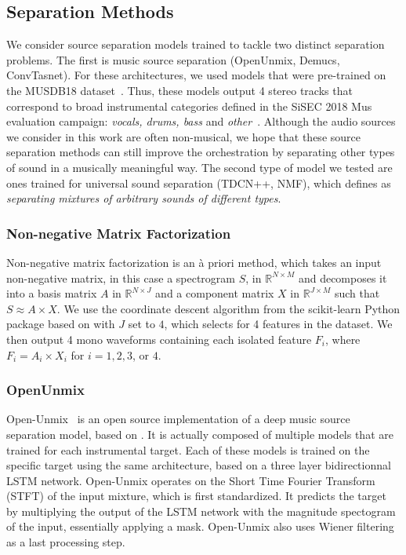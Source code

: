 \documentclass{article}
\begin{document}
		\subsection{Separation Methods}
	We consider source separation models trained to tackle two distinct separation problems. The first is music source separation (OpenUnmix, Demucs, ConvTasnet). For these architectures, we used models that were pre-trained on the MUSDB18 dataset~\cite{MUSDB18}. Thus, these models output 4 stereo tracks that correspond to broad instrumental categories defined in the SiSEC 2018 Mus evaluation campaign: \textit{vocals, drums, bass} and \textit{other}~\cite{Stoter_SiSEC}. Although the audio sources we consider in this work are often non-musical, we hope that these source separation methods can still improve the orchestration by separating other types of sound in a musically meaningful way.
	The second type of model we tested are ones trained for universal sound separation (TDCN++, NMF), which \cite{tdcnpp} defines as \textit{separating mixtures of arbitrary sounds of different types}. 
	
			\subsubsection{Non-negative Matrix Factorization} 
			Non-negative matrix factorization \cite{Cichocki_NMF} \cite{Fevotte_NMF} is an \`a priori method, which takes an input non-negative matrix, in this case a spectrogram $S$, in $\mathbb{R} ^{N\times M}$ and decomposes it into a basis matrix $A$ in $\mathbb{R}^{N\times J}$ and a component matrix $X$ in $\mathbb{R}^{J\times M}$ such that $S\approx A\times X$. We use the coordinate descent algorithm from the scikit-learn Python package based on \cite{Cichocki_NMF} with $J$ set to $4$, which selects for 4 features in the dataset. We then output 4 mono waveforms containing each isolated feature $F_i$, where $F_i=A_i\times X_i$ for $i = 1, 2, 3$, or $4$.
			
			\subsubsection{OpenUnmix}
			Open-Unmix~\cite{open-unmix} is an open source implementation of a deep music source separation model, based on \cite{Uhlich2017}. It is actually composed of multiple models that are trained for each instrumental target. Each of these models is trained on the specific target using the same architecture, based on a three layer bidirectionnal LSTM network. Open-Unmix operates on the Short Time Fourier Transform (STFT) of the input mixture, which is first standardized. It predicts the target by multiplying the output of the LSTM network with the magnitude spectogram of the input, essentially applying a mask. Open-Unmix also uses Wiener filtering as a last processing step.
			
\end{document}
